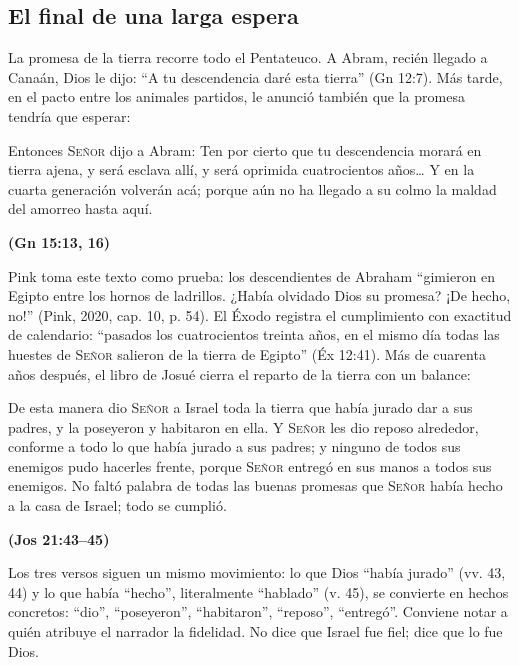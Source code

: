 \documentclass[11pt,letterpaper]{article}
\newcommand{\SENOR}{\textsc{Señor}}
\newcommand{\fuente}[1]{\par\hfill{\upshape\bfseries\small\textcolor{azul}{#1}}}
\begin{document}
\subsection{El final de una larga espera}
La promesa de la tierra recorre todo el Pentateuco. A Abram, recién llegado a Canaán, Dios le dijo: ``A tu descendencia daré esta tierra'' (Gn 12:7). Más tarde, en el pacto entre los animales partidos, le anunció también que la promesa tendría que esperar:

\begin{cita}Entonces \SENOR{} dijo a Abram: Ten por cierto que tu descendencia morará en tierra ajena, y será esclava allí, y será oprimida cuatrocientos años\ldots{} Y en la cuarta generación volverán acá; porque aún no ha llegado a su colmo la maldad del amorreo hasta aquí.\fuente{(Gn 15:13, 16)}\end{cita}

Pink toma este texto como prueba: los descendientes de Abraham ``gimieron en Egipto entre los hornos de ladrillos. ¿Había olvidado Dios su promesa? ¡De hecho, no!'' (Pink, 2020, cap. 10, p. 54). El Éxodo registra el cumplimiento con exactitud de calendario: ``pasados los cuatrocientos treinta años, en el mismo día todas las huestes de \SENOR{} salieron de la tierra de Egipto'' (Éx 12:41). Más de cuarenta años después, el libro de Josué cierra el reparto de la tierra con un balance:

\begin{cita}De esta manera dio \SENOR{} a Israel toda la tierra que había jurado dar a sus padres, y la poseyeron y habitaron en ella. Y \SENOR{} les dio reposo alrededor, conforme a todo lo que había jurado a sus padres; y ninguno de todos sus enemigos pudo hacerles frente, porque \SENOR{} entregó en sus manos a todos sus enemigos. No faltó palabra de todas las buenas promesas que \SENOR{} había hecho a la casa de Israel; todo se cumplió.\fuente{(Jos 21:43--45)}\end{cita}

Los tres versos siguen un mismo movimiento: lo que Dios ``había jurado'' (vv. 43, 44) y lo que había ``hecho'', literalmente ``hablado'' (v. 45), se convierte en hechos concretos: ``dio'', ``poseyeron'', ``habitaron'', ``reposo'', ``entregó''. Conviene notar a quién atribuye el narrador la fidelidad. No dice que Israel fue fiel; dice que lo fue Dios.
\end{document}
